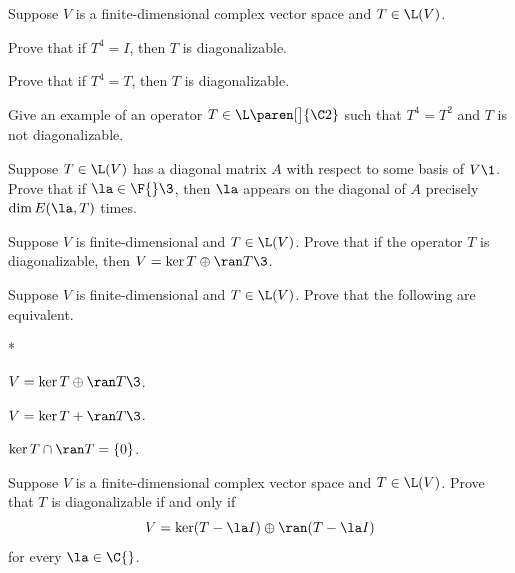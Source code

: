 
\exercise
Suppose $V$ is a finite-dimensional complex vector space and $T \in \L(V)$.
\begin{subtheorem}
\item
Prove that if $T^4 = I$, then $T$ is diagonalizable.
\item
Prove that if $T^4 = T$, then $T$ is diagonalizable.
\item
Give an example of an operator $T \in \L\paren[\big]{\C2}$ such that $T^4 = T^2$ and $T$ is not diagonalizable.
\end{subtheorem}
\exercisesubtheoremend


\exercise
Suppose $T \in \L(V)$ has a diagonal matrix $A$ with respect to some
basis of $V\1$. Prove that if $\la \in \F{}\3$, then $\la$ appears on the diagonal of $A$ precisely $\dim E(\la, T)$ times.


\exercise
Suppose $V$ is finite-dimensional and $T \in \L(V)$.
Prove that if the operator $T$ is diagonalizable, then $V = \ker T \oplus \ran T\3$.\label{5diagdir}


\exercise
Suppose $V$ is finite-dimensional and $T \in \L(V)$. Prove that the following are equivalent.\label{nullrandir}
\begin{subtheorem}*
\item
$V = \ker T \oplus \ran T\3$.
\item
$V = \ker T + \ran T\3$.
\item
$\ker T \cap \ran T = \{0\}$.
\end{subtheorem}
\exercisesubtheoremend

\exercise
Suppose $V$ is a finite-dimensional complex vector space and $T \in \L(V)$. Prove that $T$ is diagonalizable if and only if \label{diagKerRan}
\[
V = \ker(T - \la I) \oplus \ran(T - \la I)
\]
for every $\la \in \C{}$.

